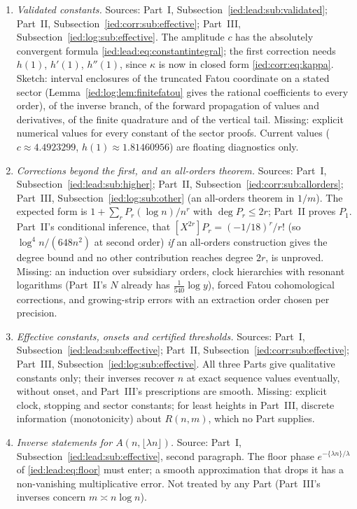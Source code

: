 \documentclass[11pt,letterpaper]{article}
\theoremstyle{remark}\newtheorem{remark}[theorem]{Remark}
\begin{document}
\begin{enumerate}[label=\arabic*.,ref=\arabic*,leftmargin=*,itemsep=4pt]
\item\label{ied:q:validated} \emph{Validated constants.} Sources: Part~I, Subsection~\ref{ied:lead:sub:validated}; Part~II, Subsection~\ref{ied:corr:sub:effective}; Part~III, Subsection~\ref{ied:log:sub:effective}. The amplitude $c$ has the absolutely convergent formula \eqref{ied:lead:eq:constantintegral}; the first correction needs $h(1)$, $h'(1)$, $h''(1)$, since $\kappa$ is now in closed form \eqref{ied:corr:eq:kappa}. Sketch: interval enclosures of the truncated Fatou coordinate on a stated sector (Lemma~\ref{ied:log:lem:finitefatou} gives the rational coefficients to every order), of the inverse branch, of the forward propagation of values and derivatives, of the finite quadrature and of the vertical tail. Missing: explicit numerical values for every constant of the sector proofs. Current values ($c\approx4.4923299$, $h(1)\approx1.81460956$) are floating diagnostics only.
\item\label{ied:q:higher} \emph{Corrections beyond the first, and an all-orders theorem.} Sources: Part~I, Subsection~\ref{ied:lead:sub:higher}; Part~II, Subsection~\ref{ied:corr:sub:allorders}; Part~III, Subsection~\ref{ied:log:sub:other} (an all-orders theorem in $1/m$). The expected form is $1+\sum_rP_r(\log n)/n^r$ with $\deg P_r\le2r$; Part~II proves $P_1$. Part~II's conditional inference, that $[X^{2r}]P_r=(-1/18)^r/r!$ (so $\log^4n/(648n^2)$ at second order) \emph{if} an all-orders construction gives the degree bound and no other contribution reaches degree $2r$, is unproved. Missing: an induction over subsidiary orders, clock hierarchies with resonant logarithms (Part~II's $N$ already has $\frac1{540}\log y$), forced Fatou cohomological corrections, and growing-strip errors with an extraction order chosen per precision.
\item\label{ied:q:effective} \emph{Effective constants, onsets and certified thresholds.} Sources: Part~I, Subsection~\ref{ied:lead:sub:effective}; Part~II, Subsection~\ref{ied:corr:sub:effective}; Part~III, Subsection~\ref{ied:log:sub:effective}. All three Parts give qualitative constants only; their inverses recover $n$ at exact sequence values eventually, without onset, and Part~III's prescriptions are smooth. Missing: explicit clock, stopping and sector constants; for least heights in Part~III, discrete information (monotonicity) about $R(n,m)$, which no Part supplies.
\item\label{ied:q:floorinverse} \emph{Inverse statements for $A(n,\lfloor\lambda n\rfloor)$.} Source: Part~I, Subsection~\ref{ied:lead:sub:effective}, second paragraph. The floor phase $e^{-\{\lambda n\}/\lambda}$ of \eqref{ied:lead:eq:floor} must enter; a smooth approximation that drops it has a non-vanishing multiplicative error. Not treated by any Part (Part~III's inverses concern $m\asymp n\log n$).

\end{enumerate}
\end{document}
